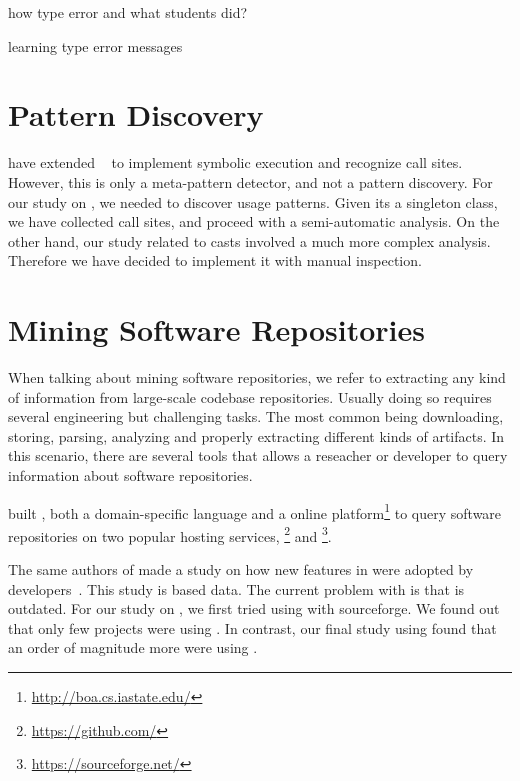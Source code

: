 how type error and what students did?
\cite{Wu:2017:TEF:3152284.3133929}

learning type error messages
\cite{Wu:2017:LUF:3152284.3133930}


\section{Pattern Discovery}

\cite{5463349} have extended \asm{}~\cite{Bruneton02asm:a,Kuleshov07} to implement symbolic execution and recognize call sites.
However, this is only a meta-pattern detector, and not a pattern discovery.
For our study on \smu{}, we needed to discover usage patterns.
Given its a singleton class, we have collected call sites,
and proceed with a semi-automatic analysis.
On the other hand, our study related to casts involved a much more complex analysis.
Therefore we have decided to implement it with manual inspection.

\section{Mining Software Repositories}

When talking about mining software repositories, we refer to extracting any kind of information from large-scale codebase repositories.
Usually doing so requires several engineering but challenging tasks.
The most common being downloading, storing, parsing, analyzing and properly extracting different kinds of artifacts.
In this scenario, there are several tools that allows a reseacher or developer to query information about software repositories.

\cite{Dyer-Nguyen-Rajan-Nguyen-13, Dyer-Rajan-Nguyen-13} built \boa{}, both a domain-specific language and a online platform\footnote{\url{http://boa.cs.iastate.edu/}} to query software repositories on two popular hosting services, \github{}\footnote{\url{https://github.com/}} and \sourceforge{}\footnote{\url{https://sourceforge.net/}}.

The same authors of \boa{} made a study on how new features in \java{} were adopted by developers~\cite{Dyer-Rajan-Nguyen-Nguyen-14}.
This study is based \sourceforge{} data.
The current problem with \sourceforge{} is that is outdated.
For our study on \smu{}, we first tried using \boa{} with sourceforge{}.
We found out that only few projects were using \smu{}.
In contrast, our final study using \maven{} found that an order of magnitude more were using \smu{}.

